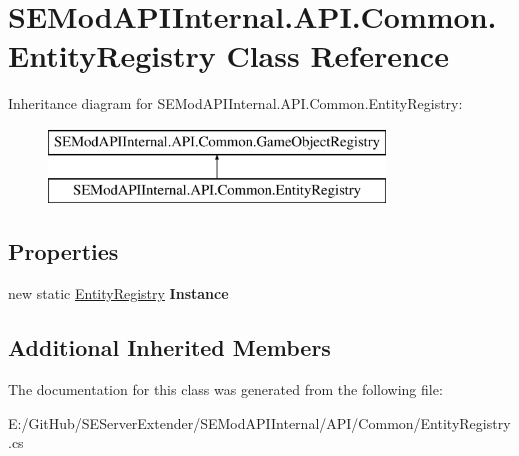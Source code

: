 \hypertarget{class_s_e_mod_a_p_i_internal_1_1_a_p_i_1_1_common_1_1_entity_registry}{}\section{S\+E\+Mod\+A\+P\+I\+Internal.\+A\+P\+I.\+Common.\+Entity\+Registry Class Reference}
\label{class_s_e_mod_a_p_i_internal_1_1_a_p_i_1_1_common_1_1_entity_registry}
Inheritance diagram for S\+E\+Mod\+A\+P\+I\+Internal.\+A\+P\+I.\+Common.\+Entity\+Registry\+:\begin{figure}[H]
\begin{center}
\leavevmode
\includegraphics[height=2.000000cm]{class_s_e_mod_a_p_i_internal_1_1_a_p_i_1_1_common_1_1_entity_registry}
\end{center}
\end{figure}
\subsection*{Properties}
\begin{DoxyCompactItemize}
\item 
\hypertarget{class_s_e_mod_a_p_i_internal_1_1_a_p_i_1_1_common_1_1_entity_registry_a3089342b10f1013d859309d129bc6753}{}new static \hyperlink{class_s_e_mod_a_p_i_internal_1_1_a_p_i_1_1_common_1_1_entity_registry}{Entity\+Registry} {\bfseries Instance}\label{class_s_e_mod_a_p_i_internal_1_1_a_p_i_1_1_common_1_1_entity_registry_a3089342b10f1013d859309d129bc6753}

\end{DoxyCompactItemize}
\subsection*{Additional Inherited Members}


The documentation for this class was generated from the following file\+:\begin{DoxyCompactItemize}
\item 
E\+:/\+Git\+Hub/\+S\+E\+Server\+Extender/\+S\+E\+Mod\+A\+P\+I\+Internal/\+A\+P\+I/\+Common/Entity\+Registry.\+cs\end{DoxyCompactItemize}
